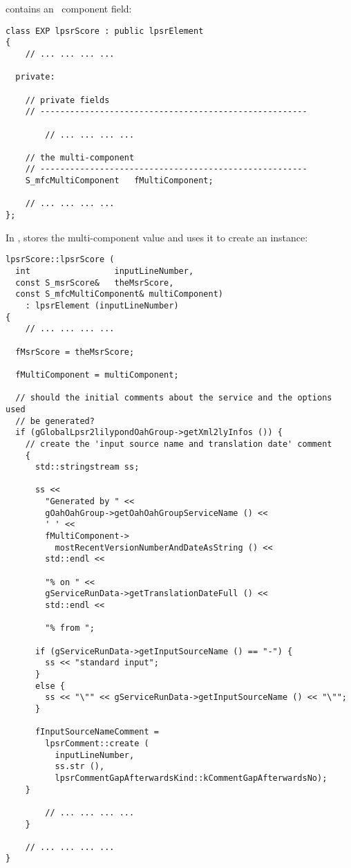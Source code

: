 contains an \mfcRepr\ component field:
\begin{lstlisting}[language=CPlusPlus]
class EXP lpsrScore : public lpsrElement
{
 	// ... ... ... ...

  private:

    // private fields
    // ------------------------------------------------------

	 	// ... ... ... ...

    // the multi-component
    // ------------------------------------------------------
    S_mfcMultiComponent   fMultiComponent;

 	// ... ... ... ...
};
\end{lstlisting}

In ,  stores the multi-component value and uses it to create an  instance:
\begin{lstlisting}[language=CPlusPlus]
lpsrScore::lpsrScore (
  int                 inputLineNumber,
  const S_msrScore&   theMsrScore,
  const S_mfcMultiComponent& multiComponent)
    : lpsrElement (inputLineNumber)
{
	// ... ... ... ...

  fMsrScore = theMsrScore;

  fMultiComponent = multiComponent;

  // should the initial comments about the service and the options used
  // be generated?
  if (gGlobalLpsr2lilypondOahGroup->getXml2lyInfos ()) {
    // create the 'input source name and translation date' comment
    {
      std::stringstream ss;

      ss <<
        "Generated by " <<
        gOahOahGroup->getOahOahGroupServiceName () <<
        ' ' <<
        fMultiComponent->
          mostRecentVersionNumberAndDateAsString () <<
        std::endl <<

        "% on " <<
        gServiceRunData->getTranslationDateFull () <<
        std::endl <<

        "% from ";

      if (gServiceRunData->getInputSourceName () == "-") {
        ss << "standard input";
      }
      else {
        ss << "\"" << gServiceRunData->getInputSourceName () << "\"";
      }

      fInputSourceNameComment =
        lpsrComment::create (
          inputLineNumber,
          ss.str (),
          lpsrCommentGapAfterwardsKind::kCommentGapAfterwardsNo);
    }

	 	// ... ... ... ...
 	}

 	// ... ... ... ...
}
\end{lstlisting}


